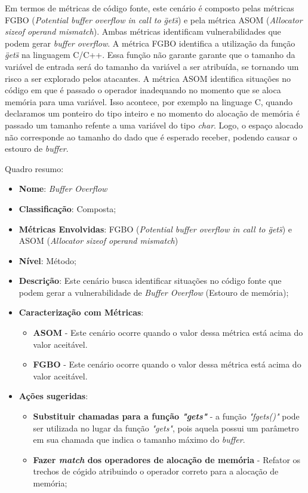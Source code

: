 Em termos de métricas de código fonte, este cenário é composto pelas métricas FGBO (\emph{Potential buffer overflow in call to \"gets\"}) e pela métrica ASOM (\emph{Allocator sizeof operand mismatch}). Ambas métricas identificam vulnerabilidades que podem gerar \emph{buffer overflow}. A métrica FGBO identifica a utilização da função \emph{\"gets\"} na linguagem C/C++. Essa função não garante garante que o tamanho da variável de entrada será do tamanho da variável a ser atribuída, se tornando um risco a ser explorado pelos atacantes. A métrica ASOM identifica situações no código em que é passado o operador inadequando no momento que se aloca memória para uma variável. Isso acontece, por exemplo na linguage C, quando declaramos um ponteiro do tipo inteiro e no momento do alocação de memória é passado um tamanho refente a uma variável do tipo \emph{char}. Logo, o espaço alocado não corresponde ao tamanho do dado que é esperado receber, podendo causar o estouro de \emph{buffer}.

Quadro resumo:

\begin{itemize}
\item \textbf{Nome}: \emph{Buffer Overflow}
\item \textbf{Classificação}: Composta;
\item \textbf{Métricas Envolvidas}: FGBO (\emph{Potential buffer overflow in call to \"gets\"}) e ASOM (\emph{Allocator sizeof operand mismatch})
\item \textbf{Nível}: Método;
\item \textbf{Descrição}: Este cenário busca identificar situações no código fonte que podem gerar a vulnerabilidade de \emph{Buffer Overflow} (Estouro de memória);
\item \textbf{Caracterização com Métricas}: 
	\begin{itemize}
	\item \textbf{ASOM} - Este cenário ocorre quando o valor dessa métrica está acima do valor aceitável.
	\item \textbf{FGBO} - Este cenário ocorre quando o valor dessa métrica está acima do valor aceitável.
	\end{itemize}
\item \textbf{Ações sugeridas}: 
	\begin{itemize}
	\item \textbf{Substituir chamadas para a função \emph{"gets"}} - a função \emph{"fgets()"} pode ser utilizada no lugar da função  \emph{"gets"}, pois aquela possui um parâmetro em sua chamada que indica o tamanho máximo do \emph{buffer}.  
	\item \textbf{Fazer \emph{match} dos operadores de alocação de memória} - Refator os trechos de cógido atribuindo o operador correto para a alocação de memória; 
	\end{itemize}
\end{itemize}


